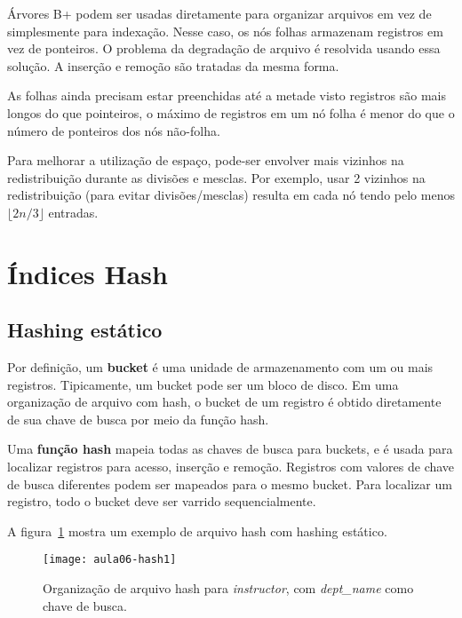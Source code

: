 Árvores B+ podem ser usadas diretamente para organizar arquivos
em vez de simplesmente para indexação. 
Nesse caso, os nós folhas armazenam registros em vez de ponteiros.
O problema da degradação de arquivo é resolvida usando essa solução.
A inserção e remoção são tratadas da mesma forma.

As folhas ainda precisam estar preenchidas até a metade visto
registros são mais longos do que pointeiros, 
o máximo de registros em um nó folha é menor do que o número de ponteiros
dos nós não-folha.

Para melhorar a utilização de espaço, pode-ser envolver mais vizinhos na 
redistribuição durante as divisões e mesclas.
Por exemplo, usar 2 vizinhos na redistribuição (para evitar divisões/mesclas)
resulta em cada nó tendo pelo menos $\lfloor 2n/3 \rfloor$ entradas.

\section{Índices Hash}

\subsection{Hashing estático}

Por definição, um \textbf{bucket} é uma unidade de armazenamento com um ou mais
registros. Tipicamente, um bucket pode ser um bloco de disco.
Em uma organização de arquivo com hash, o bucket de um registro é obtido diretamente
de sua chave de busca por meio da função hash.

Uma \textbf{função hash} mapeia todas as chaves de busca para buckets, e é usada
para localizar registros para acesso, inserção e remoção.
Registros com valores de chave de busca diferentes podem ser mapeados para o mesmo
bucket.
Para localizar um registro, todo o bucket deve ser varrido sequencialmente.

A figura~\ref{aula06:fig:hash1} mostra um exemplo de arquivo hash com hashing estático.
%
\begin{figure}[!htb]
\centering
\texttt{[image: aula06-hash1]}
\caption{Organização de arquivo hash para \emph{instructor}, com
\emph{dept\_name} como chave de busca.}
\label{aula06:fig:hash1}
\end{figure}

